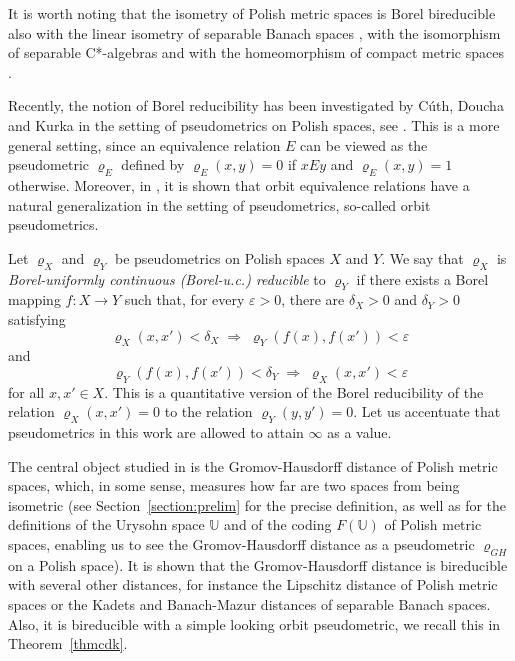 \documentclass[a4paper]{amsart}
\theoremstyle{plain}
\theoremstyle{remark}
\begin{document}
It is worth noting that the isometry of Polish metric spaces is Borel bireducible also with the linear isometry of separable Banach spaces \cite{melleraylinisom}, with the isomorphism of separable C*-algebras \cite{sabok} and with the homeomorphism of compact metric spaces \cite{zielinski}.

Recently, the notion of Borel reducibility has been investigated by C\'{u}th, Doucha and Kurka in the setting of pseudometrics on Polish spaces, see \cite{cdk1, cdk2}. This is a more general setting, since an equivalence relation $ E $ can be viewed as the pseudometric $ \varrho_{E} $ defined by $ \varrho_{E}(x, y) = 0 $ if $ xEy $ and $ \varrho_{E}(x, y) = 1 $ otherwise. Moreover, in \cite{cdk1}, it is shown that orbit equivalence relations have a natural generalization in the setting of pseudometrics, so-called orbit pseudometrics.

Let $ \varrho_{X} $ and $ \varrho_{Y} $ be pseudometrics on Polish spaces $ X $ and $ Y $. We say that $ \varrho_{X} $ is \emph{Borel-uniformly continuous (Borel-u.c.) reducible} to $ \varrho_{Y} $ if there exists a Borel mapping $ f : X \rightarrow Y $ such that, for every $ \varepsilon > 0 $, there are $ \delta_{X} > 0 $ and $ \delta_{Y} > 0 $ satisfying
$$ \varrho_{X}(x, x') < \delta_{X} \; \Rightarrow \; \varrho_{Y}(f(x), f(x')) < \varepsilon $$
and
$$ \varrho_{Y}(f(x), f(x')) < \delta_{Y} \; \Rightarrow \; \varrho_{X}(x, x') < \varepsilon $$
for all $ x, x' \in X $. This is a quantitative version of the Borel reducibility of the relation $ \varrho_{X}(x, x') = 0 $ to the relation $ \varrho_{Y}(y, y') = 0 $. Let us accentuate that pseudometrics in this work are allowed to attain $ \infty $ as a value.

The central object studied in \cite{cdk1, cdk2} is the Gromov-Hausdorff distance of Polish metric spaces, which, in some sense, measures how far are two spaces from being isometric (see Section~\ref{section:prelim} for the precise definition, as well as for the definitions of the Urysohn space $ \mathbb{U} $ and of the coding $ F(\mathbb{U}) $ of Polish metric spaces, enabling us to see the Gromov-Hausdorff distance as a pseudometric $ \varrho_{GH} $ on a Polish space). It is shown that the Gromov-Hausdorff distance is bireducible with several other distances, for instance the Lipschitz distance of Polish metric spaces or the Kadets and Banach-Mazur distances of separable Banach spaces. Also, it is bireducible with a simple looking orbit pseudometric, we recall this in Theorem~\ref{thmcdk}.
\end{document}
